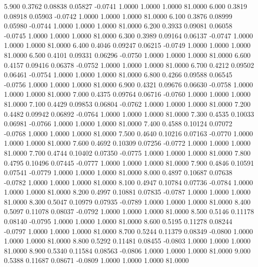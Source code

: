    5.900   0.3762   0.08838   0.05827  -0.0741   1.0000   1.0000   1.0000  81.0000
   6.000   0.3819   0.08918   0.05903  -0.0742   1.0000   1.0000   1.0000  81.0000
   6.100   0.3876   0.08999   0.05980  -0.0744   1.0000   1.0000   1.0000  81.0000
   6.200   0.3933   0.09081   0.06058  -0.0745   1.0000   1.0000   1.0000  81.0000
   6.300   0.3989   0.09164   0.06137  -0.0747   1.0000   1.0000   1.0000  81.0000
   6.400   0.4046   0.09247   0.06215  -0.0749   1.0000   1.0000   1.0000  81.0000
   6.500   0.4101   0.09331   0.06296  -0.0750   1.0000   1.0000   1.0000  81.0000
   6.600   0.4157   0.09416   0.06378  -0.0752   1.0000   1.0000   1.0000  81.0000
   6.700   0.4212   0.09502   0.06461  -0.0754   1.0000   1.0000   1.0000  81.0000
   6.800   0.4266   0.09588   0.06545  -0.0756   1.0000   1.0000   1.0000  81.0000
   6.900   0.4321   0.09676   0.06630  -0.0758   1.0000   1.0000   1.0000  81.0000
   7.000   0.4375   0.09764   0.06716  -0.0760   1.0000   1.0000   1.0000  81.0000
   7.100   0.4429   0.09853   0.06804  -0.0762   1.0000   1.0000   1.0000  81.0000
   7.200   0.4482   0.09942   0.06892  -0.0764   1.0000   1.0000   1.0000  81.0000
   7.300   0.4535   0.10033   0.06981  -0.0766   1.0000   1.0000   1.0000  81.0000
   7.400   0.4588   0.10124   0.07072  -0.0768   1.0000   1.0000   1.0000  81.0000
   7.500   0.4640   0.10216   0.07163  -0.0770   1.0000   1.0000   1.0000  81.0000
   7.600   0.4692   0.10309   0.07256  -0.0772   1.0000   1.0000   1.0000  81.0000
   7.700   0.4744   0.10402   0.07350  -0.0775   1.0000   1.0000   1.0000  81.0000
   7.800   0.4795   0.10496   0.07445  -0.0777   1.0000   1.0000   1.0000  81.0000
   7.900   0.4846   0.10591   0.07541  -0.0779   1.0000   1.0000   1.0000  81.0000
   8.000   0.4897   0.10687   0.07638  -0.0782   1.0000   1.0000   1.0000  81.0000
   8.100   0.4947   0.10784   0.07736  -0.0784   1.0000   1.0000   1.0000  81.0000
   8.200   0.4997   0.10881   0.07835  -0.0787   1.0000   1.0000   1.0000  81.0000
   8.300   0.5047   0.10979   0.07935  -0.0789   1.0000   1.0000   1.0000  81.0000
   8.400   0.5097   0.11078   0.08037  -0.0792   1.0000   1.0000   1.0000  81.0000
   8.500   0.5146   0.11178   0.08140  -0.0795   1.0000   1.0000   1.0000  81.0000
   8.600   0.5195   0.11278   0.08244  -0.0797   1.0000   1.0000   1.0000  81.0000
   8.700   0.5244   0.11379   0.08349  -0.0800   1.0000   1.0000   1.0000  81.0000
   8.800   0.5292   0.11481   0.08455  -0.0803   1.0000   1.0000   1.0000  81.0000
   8.900   0.5340   0.11584   0.08563  -0.0806   1.0000   1.0000   1.0000  81.0000
   9.000   0.5388   0.11687   0.08671  -0.0809   1.0000   1.0000   1.0000  81.0000
